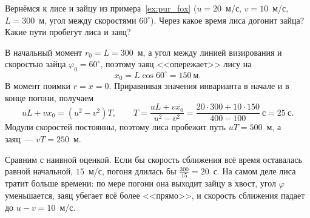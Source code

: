 \documentclass[../main.tex]{subfiles}
\begin{document}
\begin{example}
Вернёмся к лисе и зайцу из примера~\ref{ex:pur_fox} ($u = 20$~м/с, $v = 10$~м/с, $L = 300$~м,
угол между скоростями $60^\circ$). Через какое время лиса догонит зайца? Какие пути
пробегут лиса и заяц?

В начальный момент $r_0 = L = 300$~м, а угол между линией визирования и скоростью
зайца $\varphi_0 = 60^\circ$, поэтому заяц <<опережает>> лису на
\[
x_0 = L\cos 60^\circ = 150~\text{м}.
\]
В момент поимки $r = x = 0$. Приравнивая значения инварианта в начале и в конце
погони, получаем
\[
uL + vx_0 = (u^2 - v^2)T,
\qquad
T = \frac{uL + vx_0}{u^2 - v^2} = \frac{20\cdot 300 + 10\cdot 150}{400 - 100}~\text{с} = 25~\text{с}.
\]
Модули скоростей постоянны, поэтому лиса пробежит путь $uT = 500$~м, а заяц~---
$vT = 250$~м.

Сравним с наивной оценкой. Если бы скорость сближения всё время оставалась равной
начальной, $15$~м/с, погоня длилась бы $\frac{300}{15} = 20$~с. На самом деле лиса
тратит больше времени: по мере погони она выходит зайцу в хвост, угол $\varphi$
уменьшается, заяц убегает всё более <<прямо>>, и скорость сближения падает до
$u - v = 10$~м/с.
\end{example}
\end{document}
